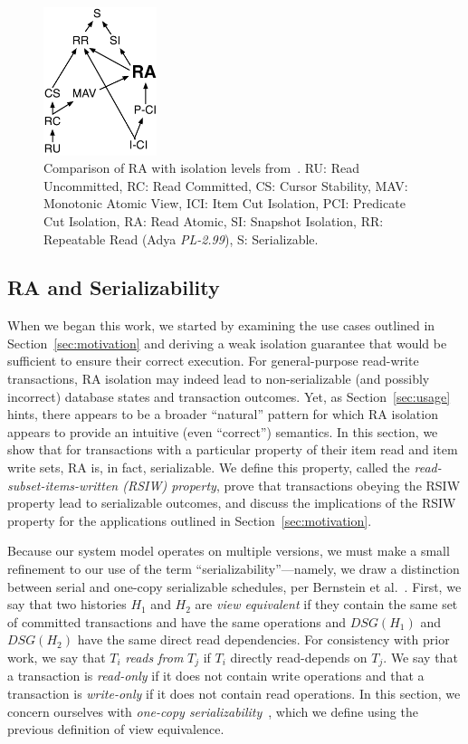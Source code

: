 \begin{figure}
\begin{center}
\includegraphics[width=1.3in]{diagram/isolation-graffle.pdf}
\end{center}
\caption{Comparison of RA with isolation levels
  from~\cite{adya,hat-vldb}. RU: Read Uncommitted, RC: Read
  Committed, CS: Cursor Stability, MAV: Monotonic Atomic View, ICI:
  Item Cut Isolation, PCI: Predicate Cut Isolation, RA: Read Atomic,
  SI: Snapshot Isolation, RR: Repeatable Read (Adya \textit{PL-2.99}), S:
  Serializable.}
\label{fig:isolation}
\end{figure}

\subsection{RA and Serializability}
\label{sec:ra-serializable}

When we began this work, we started by examining the use cases
outlined in Section~\ref{sec:motivation} and deriving a weak isolation
guarantee that would be sufficient to ensure their correct
execution. For general-purpose read-write transactions, RA isolation
may indeed lead to non-serializable (and possibly incorrect) database
states and transaction outcomes. Yet, as Section~\ref{sec:usage}
hints, there appears to be a broader ``natural'' pattern for which RA
isolation appears to provide an intuitive (even ``correct'')
semantics. In this section, we show that for transactions
with a particular property of their item read and item write sets, RA is, in
fact, serializable. We define this property, called the
\textit{read-subset-items-written (RSIW) property}, prove that transactions
obeying the RSIW property lead to serializable outcomes, and discuss
the implications of the RSIW property for the applications outlined in
Section~\ref{sec:motivation}.

Because our system model operates on multiple versions, we must make a
small refinement to our use of the term ``serializability''---namely,
we draw a distinction between serial and one-copy serializable
schedules, per Bernstein et al.~\cite{bernstein-book}. First, we say that two histories
$H_1$ and $H_2$ are \textit{view equivalent} if they contain the same
set of committed transactions and have the same operations and $DSG(H_1)$
and $DSG(H_2)$ have the same direct read dependencies. For
consistency with prior work, we say that $T_i$ \textit{reads from}
$T_j$ if $T_i$ directly read-depends on $T_j$. We say that a
transaction is \textit{read-only} if it does not contain write
operations and that a transaction is \textit{write-only} if it does
not contain read operations. In this section, we concern ourselves
with \textit{one-copy serializability}~\cite{bernstein-book}, which we
define using the previous definition of view equivalence.

